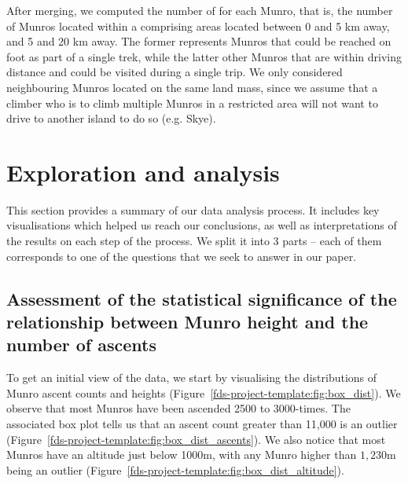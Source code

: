 \documentclass[11pt,a4paper]{article}
\begin{document}
After merging, we computed the number of  for each Munro, that is, the number of Munros located within a  comprising areas located between 0 and 5 km away, and 5 and 20 km away. The former represents Munros that could be reached on foot as part of a single trek, while the latter other Munros that are within driving distance and could be visited during a single trip. We only considered neighbouring Munros located on the same land mass, since we assume that a climber who is to climb multiple Munros in a restricted area will not want to drive to another island to do so (e.g. Skye).


\section{Exploration and  analysis}

This section provides a summary of our data analysis process. It includes key visualisations which helped us reach our conclusions, as well as interpretations of the results on each step of the process. We split it into 3 parts – each of them corresponds to one of the questions that we seek to answer in our paper.



\subsection{Assessment of the statistical significance of the relationship between Munro height and the number of ascents}
To get an initial view of the data, we start by visualising the distributions of Munro ascent counts and heights (Figure~\ref{fds-project-template:fig:box_dist}). We observe that most Munros have been ascended 2500 to 3000-times. The associated box plot tells us that an ascent count greater than 11,000 is an outlier (Figure~\ref{fds-project-template:fig:box_dist_ascents}). We also notice that most Munros have an altitude just below 1000m, with any Munro higher than $1,230$m being an outlier (Figure~\ref{fds-project-template:fig:box_dist_altitude}).
\end{document}
